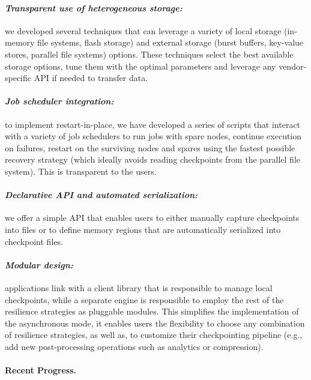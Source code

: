 \paragraph{\emph{Transparent use of heterogeneous storage:}} we
developed several techniques that can leverage a variety of local
storage (in-memory file systems, flash storage) and external storage
(burst buffers, key-value stores, parallel file systems)
options. These techniques select the best available storage options,
tune them with the optimal parameters and leverage any vendor-specific
API if needed to transfer data.
\vspace{-1em}

\paragraph{\emph{Job scheduler integration:}} to implement
restart-in-place, we have developed a series of scripts that interact
with a variety of job schedulers to run jobs with spare nodes,
continue execution on failures, restart on the surviving nodes and
spares using the fastest possible recovery strategy (which ideally
avoids reading checkpoints from the parallel file system). This is
transparent to the users.
\vspace{-1em}

\paragraph{\emph{Declarative API and automated serialization:}} we
offer a simple API that enables users to either manually capture
checkpoints into files or to define memory regions that are
automatically serialized into checkpoint files.
\vspace{-1em}

\paragraph{\emph{Modular design:}} applications link with a client
library that is responsible to manage local checkpoints, while a
separate engine is responsible to employ the rest of the resilience
strategies as pluggable modules. This simplifies the implementation
of the asynchronous mode, it enables users the flexibility to choose any
combination of resilience strategies, as well as, to customize their
checkpointing pipeline (e.g., add new post-processing operations such
as analytics or compression).

\paragraph{Recent Progress.}


